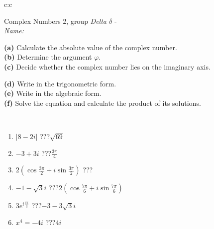 \documentclass[10pt]{report}
\begin{document}
\newpage
\thispagestyle{empty}
\begin{tabular}{c:c}
\begin{minipage}[c][104.5mm][t]{0.5\linewidth}
\begin{center}
\vspace{5mm}
{\huge Complex Numbers 2, group \textit{Delta $\delta$} -}\\[5mm]
\textit{Name:}\phantom{xxxxxxxxxxxxxxxxxxxxxxxxxxxxxxxxxxxxxxxxxxxxxxxxxxxxxxxxxxxxxxxxx}\\[5mm]
\begin{minipage}{0.95\linewidth}
\begin{center}
{\small \begin{minipage}{0.44\textwidth} \raggedright
\textbf{(a)} Calculate the absolute value of the complex number. \\[1mm]
\textbf{(b)} Determine the argument \(\varphi\). \\[1mm]
\textbf{(c)} Decide whether the complex number lies on the imaginary axis. \end{minipage} \begin{minipage}{0.54\textwidth}
\textbf{(d)} Write in the trigonometric form. \\[1mm]
\textbf{(e)} Write in the algebraic form. \\[1mm]
\textbf{(f)} Solve the equation and calculate the product of its solutions.
\end{minipage}
}
\end{center}
\end{minipage}
\\[1mm]
\begin{minipage}{0.79\linewidth}
\begin{center}
\begin{varwidth}{\linewidth}
\setlength{\itemsep}{0pt}
\begin{enumerate}
\large
\item $|8-2i|$\quad \dotfill\; ???\;\dotfill \quad $\sqrt{69}$
\item $-3+3i$\quad \dotfill\; ???\;\dotfill \quad $\frac{3\pi}{4}$
\item $2\left(\cos{\frac{3\pi}{2}}+i\sin{\frac{3\pi}{2}}\right)$\quad \dotfill\; ???\;\dotfill \quad {}
\item $-1-\sqrt{3}i$\quad \dotfill\; ???\;\dotfill \quad $2\left(\cos{\frac{7\pi}{6}}+i\sin{\frac{7\pi}{6}}\right)$
\item $3e^{i\frac{4\pi}{3}}$\quad \dotfill\; ???\;\dotfill \quad $-3-3\sqrt{3}i$
\item $x^4=-4i$\quad \dotfill\; ???\;\dotfill \quad $4i$

\end{enumerate}
\end{varwidth}
\end{center}
\end{minipage}
\end{center}
\end{minipage}
\end{tabular}
\end{document}
